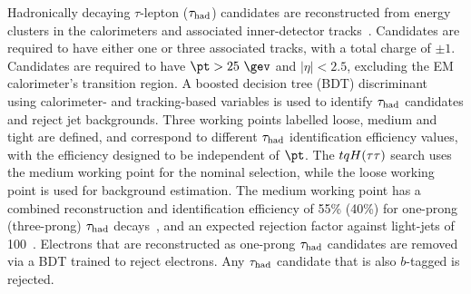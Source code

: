 Hadronically decaying $\tau$-lepton ($\tau_{\mathrm{had}}$) candidates are reconstructed from energy clusters in the calorimeters and
associated inner-detector tracks~\cite{ATL-PHYS-PUB-2015-045}. Candidates are required to have either one or three associated tracks,
with a total charge of $\pm 1$. Candidates are required to have $\pt > 25~\gev$ and $|\eta|<2.5$, excluding the EM calorimeter's transition region.
A boosted decision tree (BDT) discriminant~\cite{Breiman:1984jka,Friedman:2002we,Freund:1997xna} using calorimeter- and tracking-based variables is used to identify $\tau_{\mathrm{had}}$ candidates and reject
jet backgrounds. Three working points labelled loose, medium and tight are defined, and correspond to different $\tau_{\mathrm{had}}$ identification efficiency 
values, with the efficiency designed to be independent of $\pt$. The $tqH(\tau\tau)$ search uses the medium
working point for the nominal selection, while the loose working point is used for background estimation.
The medium working point has a combined reconstruction and identification efficiency of 55\% (40\%) for one-prong (three-prong) $\tau_{\mathrm{had}}$ 
decays~\cite{ATLAS-CONF-2017-029}, and an expected rejection factor against light-jets of 100~\cite{ATL-PHYS-PUB-2015-045}. 
Electrons that are reconstructed as one-prong $\tau_{\mathrm{had}}$ candidates are removed via a BDT trained to reject electrons.
Any $\tau_{\mathrm{had}}$ candidate that is also $b$-tagged is rejected.


